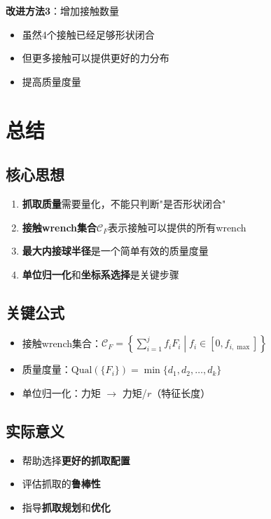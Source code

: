 \documentclass[12pt,a4paper]{article}
\begin{document}
\textbf{改进方法3}：增加接触数量
\begin{itemize}
\item 虽然4个接触已经足够形状闭合
\item 但更多接触可以提供更好的力分布
\item 提高质量度量
\end{itemize}

\section{总结}

\subsection{核心思想}

\begin{enumerate}
\item \textbf{抓取质量}需要量化，不能只判断"是否形状闭合"
\item \textbf{接触wrench集合}$\mathcal{C}_F$表示接触可以提供的所有wrench
\item \textbf{最大内接球半径}是一个简单有效的质量度量
\item \textbf{单位归一化}和\textbf{坐标系选择}是关键步骤
\end{enumerate}

\subsection{关键公式}

\begin{itemize}
\item 接触wrench集合：$\mathcal{C}_F = \left\{\sum_{i=1}^j f_i F_i \middle| f_i \in [0, f_{i,\max}] \right\}$
\item 质量度量：$\text{Qual}(\{F_i\}) = \min\{d_1, d_2, \ldots, d_k\}$
\item 单位归一化：力矩 $\to$ 力矩/$r$（特征长度）
\end{itemize}

\subsection{实际意义}

\begin{itemize}
\item 帮助选择\textbf{更好的抓取配置}
\item 评估抓取的\textbf{鲁棒性}
\item 指导\textbf{抓取规划}和\textbf{优化}
\end{itemize}
\end{document}
